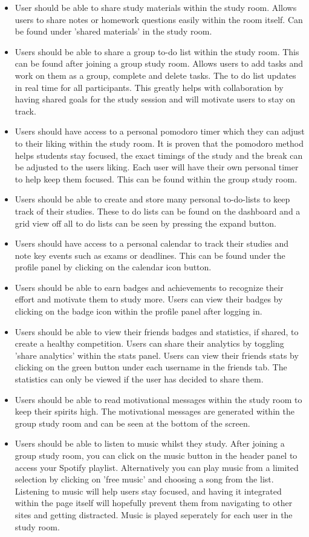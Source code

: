 \begin{itemize}
\item User should be able to share study materials within the study room. Allows users to share notes or homework questions easily within the room itself. Can be found under 'shared materials' in the study room.
\item Users should be able to share a group to-do list within the study room. This can be found after joining a group study room. Allows users to add tasks and work on them as a group, complete and delete tasks. The to do list updates in real time for all participants. This greatly helps with collaboration by having shared goals for the study session and will motivate users to stay on track.
\item Users should have access to a personal pomodoro timer which they can adjust to their liking within the study room. It is proven that the pomodoro method helps students stay focused, the exact timings of the study and the break can be adjusted to the users liking. Each user will have their own personal timer to help keep them focused. This can be found within the group study room.
\item Users should be able to create and store many personal to-do-lists to keep track of their studies. These to do lists can be found on the dashboard and a grid view off all to do lists can be seen by pressing the expand button.
\item Users should have access to a personal calendar to track their studies and note key events such as exams or deadlines. This can be found under the profile panel by clicking on the calendar icon button.
\item Users should be able to earn badges and achievements to recognize their effort and motivate them to study more. Users can view their badges by clicking on the badge icon within the profile panel after logging in.
\item Users should be able to view their friends badges and statistics, if shared, to create a healthy competition. Users can share their analytics by toggling 'share analytics' within the stats panel. Users can view their friends stats by clicking on the green button under each username in the friends tab. The statistics can only be viewed if the user has decided to share them.
\item Users should be able to read motivational messages within the study room to keep their spirits high. The motivational messages are generated within the group study room and can be seen at the bottom of the screen.
\item Users should be able to listen to music whilst they study. After joining a group study room, you can click on the music button in the header panel to access your Spotify playlist. Alternatively you can play music from a limited selection by clicking on 'free music' and choosing a song from the list. Listening to music will help users stay focused, and having it integrated within the page itself will hopefully prevent them from navigating to other sites and getting distracted. Music is played seperately for each user in the study room.

\end{itemize}
